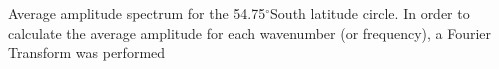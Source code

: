\label{fig:fourier_spectrum}
Average amplitude spectrum for the 54.75$^{\circ}$South latitude circle. In order to calculate the average amplitude for each wavenumber (or frequency), a Fourier Transform was performed  
